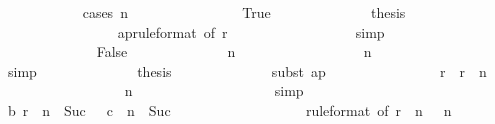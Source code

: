 \begin{isabellebody}
\ \ \ \ \ \ \ \ \ \ \isamarkupfalse%
\ {\isacharparenleft}cases\ {\isachardoublequoteopen}n\ {\isacharequal}\ {}{\isachardoublequoteclose}{\isacharparenright}\isanewline
\ \ \ \ \ \ \ \ \ \ \ \ \isamarkupfalse%
\ True\isanewline
\ \ \ \ \ \ \ \ \ \ \ \ \isamarkupfalse%
\ {\isacharquery}thesis\isanewline
\ \ \ \ \ \ \ \ \ \ \ \ \ \ \isamarkupfalse%
\ {\isacharasterisk}{\isacharparenleft}{}{\isacharparenright}\ ap{\isacharprime}{\isacharbrackleft}rule{\isacharunderscore}format{\isacharcomma}\ of\ {\isachardoublequoteopen}r{}\ {\isacharplus}\ {}{\isachardoublequoteclose}{\isacharbrackright}\isanewline
\ \ \ \ \ \ \ \ \ \ \ \ \ \ \isamarkupfalse%
\ simp\isanewline
\ \ \ \ \ \ \ \ \ \ \isamarkupfalse%
\isanewline
\ \ \ \ \ \ \ \ \ \ \ \ \isamarkupfalse%
\ False\isanewline
\ \ \ \ \ \ \ \ \ \ \ \ \isamarkupfalse%
\ {\isachardoublequoteopen}n\ {\isachargreater}\ {}{\isachardoublequoteclose}\isanewline
\ \ \ \ \ \ \ \ \ \ \ \ \ \ \isamarkupfalse%
\ {\isacharbackquoteopen}n\ {\isasymnoteq}\ {}{\isacharbackquoteclose}\isanewline
\ \ \ \ \ \ \ \ \ \ \ \ \ \ \isamarkupfalse%
\ simp\isanewline
\ \ \ \ \ \ \ \ \ \ \ \ \isamarkupfalse%
\ {\isacharquery}thesis\isanewline
\ \ \ \ \ \ \ \ \ \ \ \ \isamarkupfalse%
\ {\isacharparenleft}subst\ ap{\isacharprime}{\isacharparenright}\isanewline
\ \ \ \ \ \ \ \ \ \ \ \ \ \ \isamarkupfalse%
\ {\isachardoublequoteopen}r{}\ {\isacharless}\ r{}\ {\isacharplus}\ n\ {\isacharminus}\ {}{\isachardoublequoteclose}\isanewline
\ \ \ \ \ \ \ \ \ \ \ \ \ \ \ \ \isamarkupfalse%
\ {\isacharbackquoteopen}n\ {\isachargreater}\ {}{\isacharbackquoteclose}\isanewline
\ \ \ \ \ \ \ \ \ \ \ \ \ \ \ \ \isamarkupfalse%
\ simp\isanewline
\ \ \ \ \ \ \ \ \ \ \ \ \ \ \isamarkupfalse%
\ {\isachardoublequoteopen}b\ {\isacharparenleft}r{}\ {\isacharplus}\ n\ {\isacharminus}\ Suc\ {}{\isacharparenright}\ {\isasymle}\ c{}\ {\isacharplus}\ n\ {\isacharminus}\ Suc\ {}{\isachardoublequoteclose}\isanewline
\ \ \ \ \ \ \ \ \ \ \ \ \ \ \ \ \isamarkupfalse%
\ {\isacharasterisk}{\isacharparenleft}{}{\isacharparenright}{\isacharbrackleft}rule{\isacharunderscore}format{\isacharcomma}\ of\ {\isachardoublequoteopen}r{}\ {\isacharplus}\ n\ {\isacharminus}\ {}{\isachardoublequoteclose}{\isacharbrackright}\ {\isacharbackquoteopen}n\ {\isachargreater}\ {}{\isacharbackquoteclose}\isanewline

\end{isabellebody}
